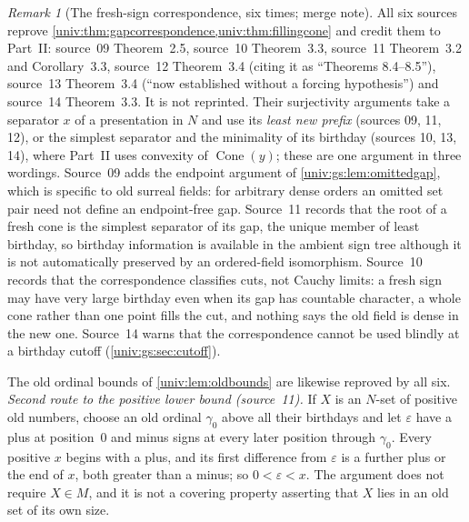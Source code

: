 \documentclass[11pt,letterpaper]{article}
\numberwithin{equation}{section}
\theoremstyle{definition}
\theoremstyle{remark}
\newtheorem{remark}[remark]{Remark}
\newcommand{\Cone}{\operatorname{Cone}}
\begin{document}
\begin{remark}[The fresh-sign correspondence, six times; merge note]\label{univ:gs:rem:signroutes}
All six sources reprove \cref{univ:thm:gapcorrespondence,univ:thm:fillingcone}
and credit them to Part~II: source~09 Theorem~2.5, source~10 Theorem~3.3,
source~11 Theorem~3.2 and Corollary~3.3, source~12 Theorem~3.4 (citing it as
``Theorems 8.4--8.5''), source~13 Theorem~3.4 (``now established without a
forcing hypothesis'') and source~14 Theorem~3.3. It is not reprinted. Their
surjectivity arguments take a separator $x$ of a presentation in $N$ and use its
\emph{least new prefix} (sources 09, 11, 12), or the simplest separator and the
minimality of its birthday (sources 10, 13, 14), where Part~II uses convexity of
$\Cone(y)$; these are one argument in three wordings. Source~09 adds the
endpoint argument of \cref{univ:gs:lem:omittedgap}, which is specific to old
surreal fields: for arbitrary dense orders an omitted set pair need not define an
endpoint-free gap. Source~11 records that the root of a fresh cone is the
simplest separator of its gap, the unique member of least birthday, so birthday
information is available in the ambient sign tree although it is not
automatically preserved by an ordered-field isomorphism. Source~10 records that
the correspondence classifies cuts, not Cauchy limits: a fresh sign may have very
large birthday even when its gap has countable character, a whole cone rather
than one point fills the cut, and nothing says the old field is dense in the new
one. Source~14 warns that the correspondence cannot be used blindly at a birthday
cutoff (\cref{univ:gs:sec:cutoff}).
\end{remark}

The old ordinal bounds of \cref{univ:lem:oldbounds} are likewise reproved by all
six. \emph{Second route to the positive lower bound (source~11).} If $X$ is an
$N$-set of positive old numbers, choose an old ordinal $\gamma_0$ above all their
birthdays and let $\varepsilon$ have a plus at position~$0$ and minus signs at
every later position through $\gamma_0$. Every positive $x$ begins with a plus,
and its first difference from $\varepsilon$ is a further plus or the end of $x$,
both greater than a minus; so $0<\varepsilon<x$. The argument does not require
$X\in M$, and it is not a covering property asserting that $X$ lies in an old set
of its own size.
\end{document}
